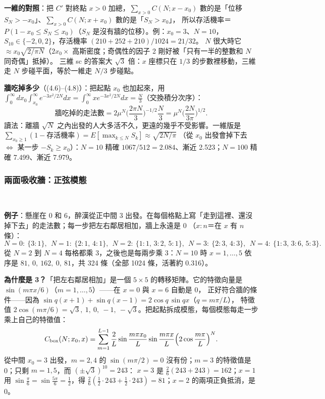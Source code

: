 \textbf{一維的對照}：把 $C'$ 對終點 $x>0$ 加總，$\sum_{x>0}C(N;x-x_0)$ 數的是「位移 $S_N>-x_0$」、$\sum_{x>0}C(N;x+x_0)$ 數的是「$S_N>x_0$」，
所以存活機率＝$P(1-x_0\le S_N\le x_0)$（$S_N$ 是沒有牆的位移）。例：$x_0=3$、$N=10$，$S_{10}\in\{-2,0,2\}$，存活機率 $(210+252+210)/1024=21/32$。
$N$ 很大時它 $\approx x_0\sqrt{2/\pi N}$（$2x_0\times$ 高斯密度；奇偶性的因子 2 剛好被「只有一半的整數和 $N$ 同奇偶」抵掉）。
三維 sc 的答案大 $\sqrt3$ 倍：$x$ 座標只在 $1/3$ 的步數裡移動，三維走 $N$ 步碰平面，等於一維走 $N/3$ 步碰點。
\begin{table}[H]
\centering
\small
\FourTabSurvive
\caption{起點 $x_0=3$ 的存活機率：精確值與漸近式（一維與 sc 都是 $\propto N^{-1/2}$，一維終究一定掉下去）。下兩列是一維版的 (4.8)：
所有起點加起來被牆吃掉多少（$N=10$ 時漸近式還不準）}\label{four-tab-survive}
\end{table}

\textbf{牆吃掉多少}（(4.6)--(4.8)）：把起點 $x_0$ 也加起來，用 $\int_0^\infty dx_0\int_{x_0}^\infty e^{-3x^2/2N}dx=\int_0^\infty xe^{-3x^2/2N}dx=\frac N3$（交換積分次序）：
\[\text{牆吃掉的走法數}=2\mu^N\Big(\frac{2\pi N}{3}\Big)^{-1/2}\frac N3=\mu^N\Big(\frac{2N}{3\pi}\Big)^{1/2}.\tag{4.8}\]
讀法：離牆 $\sqrt N$ 之內出發的人大多活不久，更遠的幾乎不受影響。一維版是 $\sum_{x_0\ge1}(1-\text{存活機率})=E[\max_{k\le N}S_k]\approx\sqrt{2N/\pi}$
（從 $x_0$ 出發會掉下去 $\Leftrightarrow$ 某一步 $-S_k\ge x_0$）：$N=10$ 精確 $1067/512=2.084$、漸近 2.523；$N=100$ 精確 7.499、漸近 7.979。

\subsubsection{兩面吸收牆：正弦模態}
\ 

\textbf{例子}：懸崖在 0 和 6，醉漢從正中間 3 出發。在每個格點上寫「走到這裡、還沒掉下去」的走法數；每一步把左右鄰居相加，牆上永遠是 0
（$x{:}n$＝在 $x$ 有 $n$ 條）：
\[N=0{:}\ \{3{:}1\},\ \ N=1{:}\ \{2{:}1,\,4{:}1\},\ \ N=2{:}\ \{1{:}1,\,3{:}2,\,5{:}1\},\ \ N=3{:}\ \{2{:}3,\,4{:}3\},\ \ N=4{:}\ \{1{:}3,\,3{:}6,\,5{:}3\}.\]
從 $N=2$ 到 $N=4$ 每格都乘 3，之後也是每兩步乘 3：$N=10$ 時 $x=1,\dots,5$ 依序是 $81,\ 0,\ 162,\ 0,\ 81$，共 324 條（全部 1024 條，活著約 0.316）。

\textbf{為什麼是 3？}「把左右鄰居相加」是一個 $5\times5$ 的轉移矩陣。它的特徵向量是 $\sin(m\pi x/6)$（$m=1,\dots,5$）——在 $x=0$ 與 $x=6$ 自動是 0，
正好符合牆的條件——因為 $\sin q(x+1)+\sin q(x-1)=2\cos q\,\sin qx$（$q=m\pi/L$），
特徵值 $2\cos(m\pi/6)=\sqrt3,\ 1,\ 0,\ -1,\ -\sqrt3$。把起點拆成模態，每個模態每走一步乘上自己的特徵值：
\[C_{\rm box}(N;x_0,x)=\sum_{m=1}^{L-1}\frac2L\sin\frac{m\pi x_0}{L}\sin\frac{m\pi x}{L}\Big(2\cos\frac{m\pi}{L}\Big)^N.\]
從中間 $x_0=3$ 出發，$m=2,4$ 的 $\sin(m\pi/2)=0$ 沒有份；$m=3$ 的特徵值是 0；只剩 $m=1,5$，而 $(\pm\sqrt3)^{10}=243$：
$x=3$ 是 $\frac26(243+243)=162$；$x=1$ 用 $\sin\frac\pi6=\sin\frac{5\pi}6=\frac12$，得 $\frac26(\frac12\cdot243+\frac12\cdot243)=81$；$x=2$ 的兩項正負抵消，是 0。

